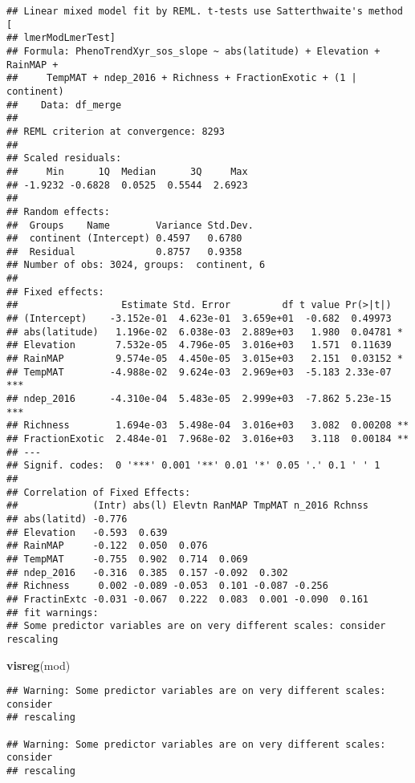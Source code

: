 \documentclass[
]{article}
\newenvironment{Shaded}{\begin{snugshade}}{\end{snugshade}}
\newcommand{\KeywordTok}[1]{\textcolor[rgb]{0.13,0.29,0.53}{\textbf{#1}}}
\newcommand{\NormalTok}[1]{#1}
\begin{document}
\begin{verbatim}
## Linear mixed model fit by REML. t-tests use Satterthwaite's method [
## lmerModLmerTest]
## Formula: PhenoTrendXyr_sos_slope ~ abs(latitude) + Elevation + RainMAP +  
##     TempMAT + ndep_2016 + Richness + FractionExotic + (1 | continent)
##    Data: df_merge
## 
## REML criterion at convergence: 8293
## 
## Scaled residuals: 
##     Min      1Q  Median      3Q     Max 
## -1.9232 -0.6828  0.0525  0.5544  2.6923 
## 
## Random effects:
##  Groups    Name        Variance Std.Dev.
##  continent (Intercept) 0.4597   0.6780  
##  Residual              0.8757   0.9358  
## Number of obs: 3024, groups:  continent, 6
## 
## Fixed effects:
##                  Estimate Std. Error         df t value Pr(>|t|)    
## (Intercept)    -3.152e-01  4.623e-01  3.659e+01  -0.682  0.49973    
## abs(latitude)   1.196e-02  6.038e-03  2.889e+03   1.980  0.04781 *  
## Elevation       7.532e-05  4.796e-05  3.016e+03   1.571  0.11639    
## RainMAP         9.574e-05  4.450e-05  3.015e+03   2.151  0.03152 *  
## TempMAT        -4.988e-02  9.624e-03  2.969e+03  -5.183 2.33e-07 ***
## ndep_2016      -4.310e-04  5.483e-05  2.999e+03  -7.862 5.23e-15 ***
## Richness        1.694e-03  5.498e-04  3.016e+03   3.082  0.00208 ** 
## FractionExotic  2.484e-01  7.968e-02  3.016e+03   3.118  0.00184 ** 
## ---
## Signif. codes:  0 '***' 0.001 '**' 0.01 '*' 0.05 '.' 0.1 ' ' 1
## 
## Correlation of Fixed Effects:
##             (Intr) abs(l) Elevtn RanMAP TmpMAT n_2016 Rchnss
## abs(latitd) -0.776                                          
## Elevation   -0.593  0.639                                   
## RainMAP     -0.122  0.050  0.076                            
## TempMAT     -0.755  0.902  0.714  0.069                     
## ndep_2016   -0.316  0.385  0.157 -0.092  0.302              
## Richness     0.002 -0.089 -0.053  0.101 -0.087 -0.256       
## FractinExtc -0.031 -0.067  0.222  0.083  0.001 -0.090  0.161
## fit warnings:
## Some predictor variables are on very different scales: consider rescaling
\end{verbatim}

\begin{Shaded}
\begin{Highlighting}[]
\KeywordTok{visreg}\NormalTok{(mod)}
\end{Highlighting}
\end{Shaded}

\begin{verbatim}
## Warning: Some predictor variables are on very different scales: consider
## rescaling

## Warning: Some predictor variables are on very different scales: consider
## rescaling
\end{verbatim}
\end{document}

